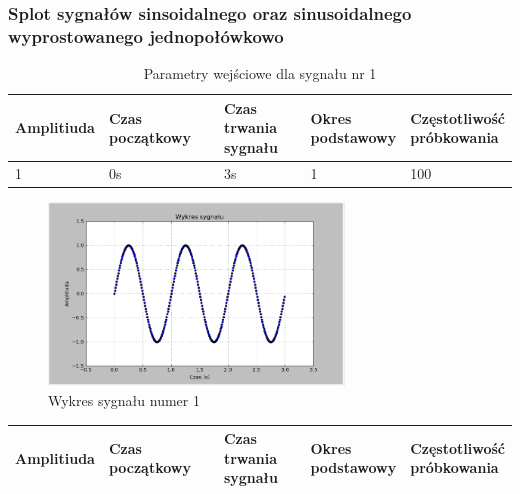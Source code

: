 \documentclass{article}
\begin{document}
{        \subsubsection{Splot sygnałów sinsoidalnego oraz sinusoidalnego wyprostowanego
            jednopołówkowo} \label{eksperyment:splot2}{

            \begin{table}[h!]
                \centering
                \begin{tabular}{|l|l|l|l|l|}
                    \hline
                    Amplitiuda & Czas początkowy & \shortstack{Czas trwania \\ sygnału} & \shortstack{Okres \\ podstawowy} & \shortstack{Częstotliwość\\ próbkowania}   \\ \hline
                    1 & 0s & 3s & 1 & 100           \\ \hline
                \end{tabular}
                \caption{Parametry wejściowe dla sygnału nr 1}
            \end{table}
            \begin{figure}[h!]
                \centering
                \includegraphics[width=0.7\textwidth]{img/splot1.png}
                \caption{Wykres sygnału numer 1}
            \end{figure}
            \FloatBarrier
            \begin{table}[h!]
                \centering
                \begin{tabular}{|l|l|l|l|l|}
                    \hline
                    Amplitiuda & Czas początkowy & \shortstack{Czas trwania \\ sygnału} & \shortstack{Okres \\ podstawowy} & \shortstack{Częstotliwość\\ próbkowania}   \\ \hline

\end{tabular}
\end{table}}}
\end{document}
